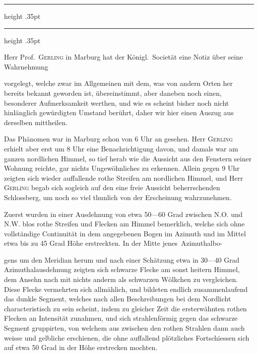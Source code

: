 \GaussVSourceUnnumbered{}
\vspace*{2.24in}
\begin{center}
\begin{minipage}{.600\linewidth}
\centering
\hrule height .35pt
\vspace{1.6mm}
\noindent{}\par
\vspace{1.6mm}
\hrule height .35pt
\end{minipage}
\par\vspace{.08in}
\end{center}

Herr Prof.\ \textsc{Gerling} in Marburg hat der Königl.\ Societät eine Notiz über seine Wahrnehmung
\begin{center}
\end{center}
\noindent vorgelegt, welche zwar im Allgemeinen mit dem, was von andern Orten her bereits bekannt geworden ist, übereinstimmt, aber daneben noch einen, besonderer Aufmerksamkeit werthen, und wie es scheint bisher noch nicht hinlänglich gewürdigten Umstand berührt, daher wir hier einen Auszug aus derselben mittheilen.

Das Phänomen war in Marburg schon von 6 Uhr an gesehen. Herr \textsc{Gerling} erhielt aber erst um 8 Uhr eine Benachrichtigung davon, und damals war am ganzen nordlichen Himmel, so tief herab wie die Aussicht aus den Fenstern seiner Wohnung reichte, gar nichts Ungewöhnliches zu erkennen. Allein gegen 9 Uhr zeigten sich wieder auffallende rothe Streifen am nordlichen Himmel, und Herr \textsc{Gerling} begab sich sogleich auf den eine freie Aussicht beherrschenden Schlossberg, um noch so viel thunlich von der Erscheinung wahrzunehmen.

Zuerst wurden in einer Ausdehnung von etwa 50—60 Grad zwischen N.O. und N.W. blos rothe Streifen und Flecken am Himmel bemerklich, welche sich ohne vollständige Continuität in dem angegebenen Bogen im Azimuth und im Mittel etwa bis zu 45 Grad Höhe erstreckten. In der Mitte \mbox{jenes Azimuthalbo-}
\par\clearpage
{}
\noindent gens um den Meridian herum und nach einer Schätzung etwa in 30—40 Grad Azimuthalausdehnung zeigten sich schwarze Flecke am sonst heitern Himmel, dem Ansehn nach mit nichts anderm als schwarzen Wölkchen zu vergleichen. Diese Flecke vermehrten sich allmählich, und bildeten endlich zusammenlaufend das dunkle Segment, welches nach allen Beschreibungen bei dem Nordlicht characteristisch zu sein scheint, indem zu gleicher Zeit die ersterwähnten rothen Flecken an Intensität zunahmen, und sich strahlenförmig gegen das schwarze Segment gruppirten, von welchem aus zwischen den rothen Strahlen dann auch weisse und gelbliche erschienen, die ohne auffallend plötzliches Fortschiessen sich auf etwa 50 Grad in der Höhe erstrecken mochten.

